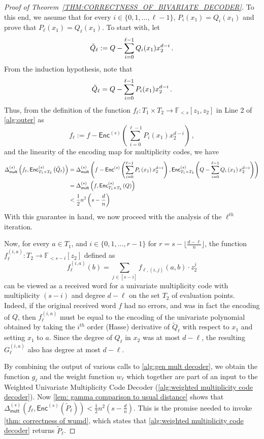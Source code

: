 \documentclass{theoretics}
\def\Field{\mathbb{F}}
\let\F\Field
\renewcommand{\tilde}[1]{\widetilde{#1}}
\newcommand{\enc}{{\mathsf{Enc}}}
\newcommand{\encs}{{\mathsf{Enc}^{(s)}}}
\newcommand{\Delm}{\Delta_{\mathsf{mult}}}
\begin{document}
\begin{proof}[Proof of Theorem~\ref{THM:CORRECTNESS_OF_BIVARIATE_DECODER}]
		To this end, we assume that for every $i \in \{0, 1, \ldots, \ell -1\}$, $P_i(x_1) = Q_i(x_1)$ and prove that $P_{\ell}(x_1) = Q_{\ell}(x_1)$. 
		To start with, let \[\Tilde{Q}_{\ell} := Q - \sum_{i = 0}^{\ell -1} Q_i(x_1)x_2^{d-i} \, .\] From the induction hypothesis, note that 
		\[\Tilde{Q}_{\ell} = Q - \sum_{i = 0}^{\ell -1} P_i(x_1)x_2^{d-i} \, .\]
		Thus, from the definition of the function $f_{\ell} \colon  T_1 \times
		T_2 \to \F_{<s}[z_1, z_2]$  in Line 2 of \cref{alg:outer}
		as \[f_{\ell} := f - \enc^{(s)}\left(\sum_{i = 0}^{\ell -1} P_i(x_1)x_2^{d-i}\right) \,
		,\] and the linearity of the encoding map for multiplicity codes, we have
		\begin{align*}
			\Delm^{(s)}\left(f_\ell, \enc^{(s)}_{T_1 \times T_2}\left(\Tilde{Q}_{\ell}\right)\right) &= \Delm^{(s)}\left(f - \enc^{(s)}\left(\sum_{i = 0}^{\ell -1} P_i\left(x_1\right)x_2^{d-i}\right),\enc^{(s)}_{T_1 \times T_2}\left(Q - \sum_{i = 0}^{\ell -1} Q_{i}\left(x_1\right)x_2^{d-i}\right)\right) \\
			&= \Delm^{(s)}\left(f,\enc^{(s)}_{T_1 \times T_2}\left(Q\right)\right) \\
			&< \frac{1}{2} n^2 \left(s-\frac{d}{n}\right) 
		\end{align*}
		With this guarantee in hand, we now proceed with the analysis of the $\ell^{th}$ iteration. 
		
		Now, for every $a \in T_1$, and $i \in \{0, 1, \ldots, r-1\}$ for $r = s - \lfloor \frac{d-\ell}{n} \rfloor$, the function $f_{\ell}^{(i, a)}\colon  T_2 \to \F_{<s-i}[z_2]$ defined as 
		\[
		f_{\ell}^{(i, a)} (b) = \sum_{j \in [s-i]} f_{\ell, (i, j)}(a, b) \cdot z_2^{j}
		\]
		can be viewed as a received word for a univariate multiplicity code
		with multiplicity $(s-i)$ and degree $d - \ell$ on the set $T_2$ of
		evaluation points. Indeed, if the original received word $f$ had no
		errors, and was in fact the encoding of $Q$, then $f_{\ell}^{(i, a)}$
		must be equal to the encoding of the univariate polynomial obtained by
		taking the $i^{th}$ order (Hasse) derivative of $\tilde{Q}_{\ell}$
		with respect to $x_1$ and setting $x_1$ to $a$. Since the degree of $Q_\ell$ in $x_2$ was at most $d-\ell$, the resulting  $G_{\ell}^{(i, a)}$ also has degree at most $d-\ell$.
		
		By combining the output of various calls to \cref{alg:gen mult decoder}, we obtain the function $g_{\ell}$ and the weight function $w_{\ell}$ which together are part of an input to the Weighted Univariate Multiplicity Code Decoder (\cref{alg:weighted multiplicity code decoder}). Now \cref{lem: gamma comparison to usual distance} shows that $\Delm^{(s)} \left(f_\ell, \encs\left( \tilde{P}_\ell\right)\right) < \frac{1}{2}n^2\left(s - \frac{d}{n}\right)$. This is the promise needed to invoke \cref{thm: correctness of wumd}, which states that \cref{alg:weighted multiplicity code decoder} returns $\tilde{P}_\ell$. 
		

\end{proof}
\end{document}
